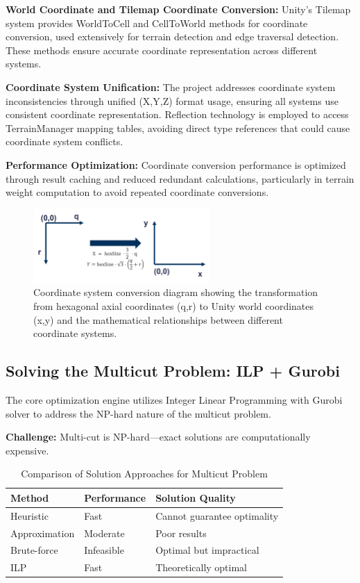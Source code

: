 \documentclass[english]{tudscrreprt}
\begin{document}
\textbf{World Coordinate and Tilemap Coordinate Conversion:} Unity's Tilemap system provides WorldToCell and CellToWorld methods for coordinate conversion, used extensively for terrain detection and edge traversal detection. These methods ensure accurate coordinate representation across different systems.

\textbf{Coordinate System Unification:} The project addresses coordinate system inconsistencies through unified (X,Y,Z) format usage, ensuring all systems use consistent coordinate representation. Reflection technology is employed to access TerrainManager mapping tables, avoiding direct type references that could cause coordinate system conflicts.

\textbf{Performance Optimization:} Coordinate conversion performance is optimized through result caching and reduced redundant calculations, particularly in terrain weight computation to avoid repeated coordinate conversions.

\begin{figure}[h]
\centering
\includegraphics[width=0.6\textwidth]{figures/coordinate_system.png}
\caption{Coordinate system conversion diagram showing the transformation from hexagonal axial coordinates (q,r) to Unity world coordinates (x,y) and the mathematical relationships between different coordinate systems.}
\label{fig:coordinate_system}
\end{figure}

\subsection{Solving the Multicut Problem: ILP + Gurobi}
The core optimization engine utilizes Integer Linear Programming with Gurobi solver to address the NP-hard nature of the multicut problem.

\textbf{Challenge:} Multi-cut is NP-hard—exact solutions are computationally expensive.

\begin{table}[h]
\centering
\caption{Comparison of Solution Approaches for Multicut Problem}
\begin{tabular}{p{3cm}p{4cm}p{5cm}}
\toprule
\textbf{Method} & \textbf{Performance} & \textbf{Solution Quality} \\
\midrule
Heuristic & Fast & Cannot guarantee optimality \\
\midrule
Approximation & Moderate & Poor results \\
\midrule
Brute-force & Infeasible & Optimal but impractical \\
\midrule
ILP & Fast & Theoretically optimal \\
\bottomrule
\end{tabular}
\end{table}
\end{document}
